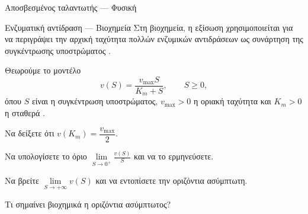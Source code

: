 \begin{problhma}{Αποσβεσμένος ταλαντωτής --- Φυσική}
\begin{center}
\end{center}
\end{problhma}

\begin{problhma}{Ενζυματική αντίδραση  --- Βιοχημεία}
Στη βιοχημεία, η εξίσωση  χρησιμοποιείται για να
περιγράψει την αρχική ταχύτητα πολλών ενζυμικών αντιδράσεων ως
συνάρτηση της συγκέντρωσης υποστρώματος \cite{michaelisMentenKinetics}.

Θεωρούμε το μοντέλο
\[
  v(S)=\frac{v_{\max}S}{K_m+S},
  \qquad S\geq0,
\]
όπου \(S\) είναι η συγκέντρωση υποστρώματος,
\(v_{\max}>0\) η οριακή ταχύτητα και \(K_m>0\) η σταθερά .
\begin{alist}
  \item Να δείξετε ότι \(v(K_m)=\dfrac{v_{\max}}{2}\).
  \item Να υπολογίσετε το όριο $\lim\limits_{S\to0^+}\frac{v(S)}{S}$ και να το ερμηνεύσετε.
  \item Να βρείτε \(\displaystyle\lim\limits_{S\to+\infty}v(S)\) και να
        εντοπίσετε την οριζόντια ασύμπτωτη.
  \item Τι σημαίνει βιοχημικά η οριζόντια ασύμπτωτος?
\end{alist}
\end{problhma}


